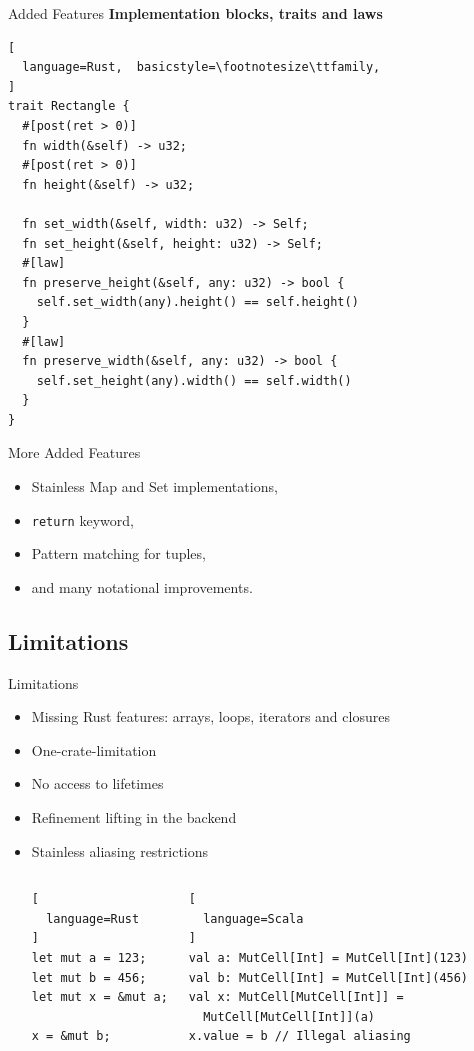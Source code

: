 \begin{frame}[fragile]{Added Features}
\textbf{Implementation blocks, traits and laws}
\begin{lstlisting}[
  language=Rust,  basicstyle=\footnotesize\ttfamily,
]
trait Rectangle {
  #[post(ret > 0)]
  fn width(&self) -> u32;
  #[post(ret > 0)]
  fn height(&self) -> u32;

  fn set_width(&self, width: u32) -> Self;
  fn set_height(&self, height: u32) -> Self;
  #[law]
  fn preserve_height(&self, any: u32) -> bool {
    self.set_width(any).height() == self.height()
  }
  #[law]
  fn preserve_width(&self, any: u32) -> bool {
    self.set_height(any).width() == self.width()
  }
}
\end{lstlisting}
\end{frame}

\begin{frame}{More Added Features}
\begin{itemize}
\item Stainless Map and Set implementations,
\item \lstinline!return! keyword,
\item Pattern matching for tuples,
\item and many notational improvements.
\end{itemize}
\end{frame}

\subsection{Limitations}

\begin{frame}[fragile]{Limitations}
\begin{itemize}
\item Missing Rust features: arrays, loops, iterators and closures
\item One-crate-limitation
\item No access to lifetimes
\item Refinement lifting in the backend
\item Stainless aliasing restrictions
\begin{columns}[T]
\begin{lstlisting}[
  language=Rust
]
let mut a = 123;
let mut b = 456;
let mut x = &mut a;

x = &mut b;
\end{lstlisting}

\begin{lstlisting}[
  language=Scala
]
val a: MutCell[Int] = MutCell[Int](123)
val b: MutCell[Int] = MutCell[Int](456)
val x: MutCell[MutCell[Int]] =
  MutCell[MutCell[Int]](a)
x.value = b // Illegal aliasing
\end{lstlisting}
\end{columns}
\end{itemize}
\end{frame}

